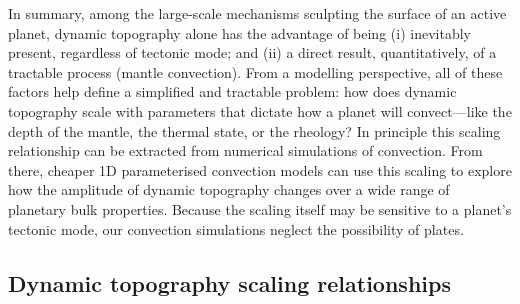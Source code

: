 In summary, among the large-scale mechanisms sculpting the surface of an active planet, dynamic topography alone has the advantage of being (i) inevitably present, regardless of tectonic mode; and (ii) a direct result, quantitatively, of a tractable process (mantle convection). From a modelling perspective, all of these factors help define a simplified and tractable problem: how does dynamic topography scale with parameters that dictate how a planet will convect---like the depth of the mantle, the thermal state, or the rheology? In principle this scaling relationship can be extracted from numerical simulations of convection. From there, cheaper 1D parameterised convection models can use this scaling to explore how the amplitude of dynamic topography changes over a wide range of planetary bulk properties. Because the scaling itself may be sensitive to a planet's tectonic mode, our convection simulations neglect the possibility of plates.

\subsection{Dynamic topography scaling relationships}\label{sec:intro-scaling}

